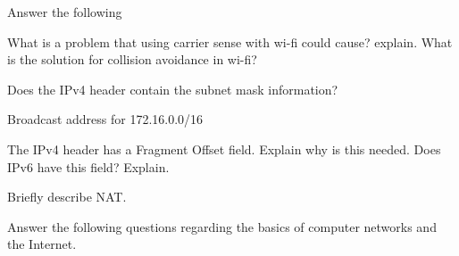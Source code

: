 \documentclass[answers,addpoints]{exam}
\begin{document}
\newpage
\begin{questions}


\question 
Answer the following


\question 
What is a problem that using carrier sense with wi-fi could cause? explain. What is the solution for collision avoidance in wi-fi?
\fillwithdottedlines{1in}


\question
Does the IPv4 header contain the subnet mask information?
\fillwithdottedlines{0.5in}


\question
Broadcast address for 172.16.0.0/16
\fillwithdottedlines{0.5in}

\question
The IPv4 header has a Fragment Offset field. Explain why is this needed. Does IPv6 have this field? Explain.
\fillwithdottedlines{1in}

\question Briefly describe NAT.
\fillwithdottedlines{1in}

\newpage
\question 
Answer the following questions regarding the basics of computer networks and the Internet.

\end{questions}
\end{document}
